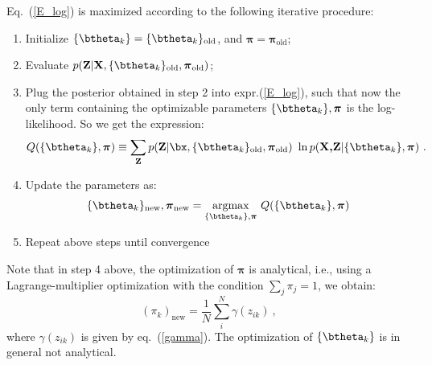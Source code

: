 Eq.~(\ref{E_log}) is maximized according to the following iterative procedure:
\begin{enumerate}
    \item Initialize $\{\btheta_k\}=\{\btheta_k\}_\mathrm{old}$, and $\boldsymbol{\pi} = \boldsymbol{\pi}_\mathrm{old}$;
    \item Evaluate $p(\textbf{Z}|\textbf{X},\{\btheta_k\}_\mathrm{old},\boldsymbol{\pi}_\mathrm{old})$;
    \item Plug the posterior obtained in step 2 into expr.(\ref{E_log}), such that now the only term containing the optimizable parameters $\{\btheta_k\},\boldsymbol{\pi}$ is the log-likelihood. So we get the expression:
    \begin{equation*}
      Q(\{\btheta_k\},\boldsymbol{\pi}) \equiv
     \sum_\textbf{Z} 
    p(\textbf{Z}|\bx,\{\btheta_k\}_\mathrm{old},\boldsymbol{\pi}_\mathrm{old})~
\ln p(\textbf{X,Z}|\{\btheta_k\},\boldsymbol{\pi})~.  
    \end{equation*}
    \item Update the parameters as:
    \begin{equation*}
      \{\btheta_k\}_\mathrm{new},\boldsymbol{\pi}_\mathrm{new} =
      \underset{\{\btheta_k\},\boldsymbol{\pi}}{\mathrm{argmax}}~Q(\{\btheta_k\},\boldsymbol{\pi})
    \end{equation*}
    \item Repeat above steps until convergence
\end{enumerate}
Note that in step 4 above, the optimization of $\boldsymbol{\pi}$ is analytical, i.e., using a Lagrange-multiplier optimization with the condition $\sum_j \pi_j = 1$, we obtain:
\begin{equation}
    (\pi_k)_\mathrm{new} = \frac{1}{N}\sum_i^N \gamma(z_{ik})~,
\end{equation}
where $\gamma(z_{ik})$ is given by eq.~(\ref{gamma}). The optimization of $\{\btheta_k\}$ is in general not analytical.


